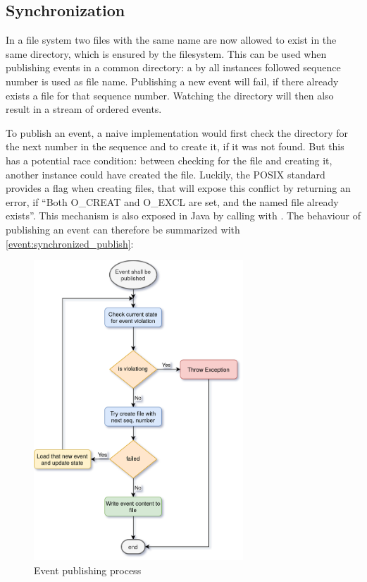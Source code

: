 \subsection{Synchronization}

In a file system two files with the same name are now allowed to exist in the same directory, which is ensured by the filesystem.
This can be used when publishing events in a common directory: a by all instances followed sequence number is used as file name.
Publishing a new event will fail, if there already exists a file for that sequence number.
Watching the directory will then also result in a stream of ordered events.

To publish an event, a naive implementation would first check the directory for the next number in the sequence and to create it, if it was not found.
But this has a potential race condition: between checking for the file and creating it, another instance could have created the file.
Luckily, the POSIX standard provides a flag when creating files, that will expose this conflict by returning an error, if \enquote{Both O\_CREAT and O\_EXCL are set, and the named file already exists}\cite{gnu:open}.
This mechanism is also exposed in Java by calling \cite{javadoc:files:write} with \cite{javadoc:standard_open_options:create_new}.
The behaviour of publishing an event can therefore be summarized with \autoref{event:synchronized_publish}:

\begin{figure}[H]
	\centering
	\includegraphics[width=0.7\textwidth]{event_publishing.png}
	\caption{Event publishing process}
	\label{event:synchronized_publish}
\end{figure}

